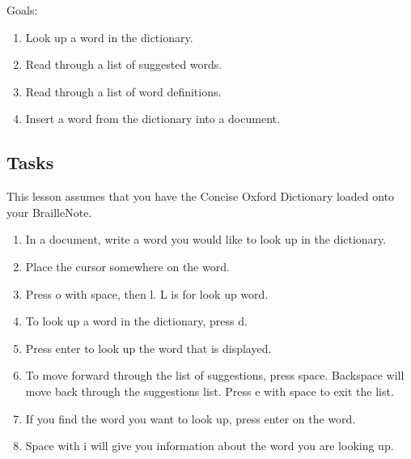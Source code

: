 \documentclass[10pt,letterpaper,twoside]{report}
\begin{document}
{{{{Goals:



\begin{enumerate}
	\item Look up a word in the dictionary.
	      
	\item Read through a list of suggested words.
	      
	\item Read through a list of word definitions.
	      
	\item Insert a word from the dictionary into a document.
\end{enumerate}



 \subsection{Tasks}



This lesson assumes that you have the Concise Oxford Dictionary loaded onto your BrailleNote.



\begin{enumerate}
	\item In a document, write a word you would like to look up in the dictionary.
	      
	\item Place the cursor somewhere on the word.
	      
	\item Press o with space, then l.  L is for look up word.
	      
	\item To look up a word in the dictionary, press d.
	      
	\item Press enter to look up the word that is displayed.
	      
	\item To move forward through the list of suggestions, press space.  Backspace will move back through the suggestions list.  Press e with space to exit the list.
	      
	\item If you find the word you want to look up, press enter on the word.
	      
	\item Space with i will give you information about the word you are looking up.
	      

\end{enumerate}}}}}
\end{document}
